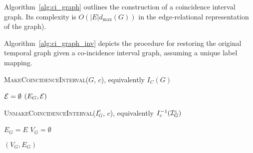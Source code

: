 Algorithm~\ref{alg:ci_graph} outlines the construction of a coincidence interval
graph. Its complexity is $O(|E|d_{\max}(G))$ in the edge-relational
representation of the graph).

Algorithm~\ref{alg:ci_graph_inv} depicts the procedure for restoring the
original temporal graph given a co-incidence interval graph, assuming a unique
label mapping.

\begin{algorithm}
  \label{alg:ci_graph}
  \caption{\textsc{MakeCoincidenceInterval($G$, $c$)}, equivalently $I_C(G)$}
  \SetAlgoLined

  $\mathcal{E} = \emptyset$\;
  \Return $(E_G, \mathcal{E})$\;
\end{algorithm}

\begin{algorithm}
  \label{alg:ci_graph_inv}
  \caption{\textsc{UnmakeCoincidenceInterval($I_G^c$, $c$)}, equivalently $I_c^{-1}(\mathcal{I}_G^c)$ }
  $E_G = E$\;
   $V_G = \emptyset$\;
  
  \Return $(V_G,E_G)$\;
\end{algorithm}


